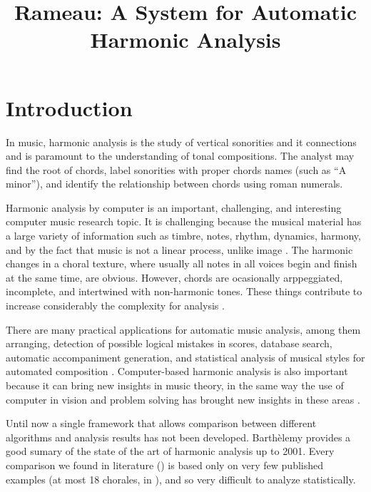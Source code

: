 \documentclass{article}
\title{Rameau: A System for Automatic Harmonic Analysis}
\begin{document}
\graphicspath{{figs/}{data/}}
\maketitle

\begin{abstract}

\end{abstract}

\section{Introduction}
\label{sec:introduction}

In music, harmonic analysis is the study of vertical sonorities and it
connections and is paramount to the understanding of tonal
compositions. The analyst may find the root of chords, label
sonorities with proper chords names (such as ``A minor''), and
identify the relationship between chords using roman
numerals.

Harmonic analysis by computer is an important, challenging, and
interesting computer music research topic. It is challenging because
the musical material has a large variety of information such as
timbre, notes, rhythm, dynamics, harmony, and by the fact that music
is not a linear process, unlike image \cite{mouton.ea:numeric}. The
harmonic changes in a choral texture, where usually all notes in all
voices begin and finish at the same time, are obvious. However, chords
are ocasionally arppeggiated, incomplete, and intertwined with
non-harmonic tones. These things contribute to increase considerably
the complexity for analysis \cite{pardo.ea:automated}.

There are many practical applications for automatic music analysis,
among them arranging, detection of possible logical mistakes in
scores, database search, automatic accompaniment generation, and
statistical analysis of musical styles for automated composition
\cite{pardo.ea:algorithms,temperley.ea:modeling}. Computer-based
harmonic analysis is also important because it can bring new insights
in music theory, in the same way the use of computer in vision and
problem solving has brought new insights in these areas
\cite{temperley.ea:modeling}. 

Until now a single framework that allows comparison between different
algorithms and analysis results has not been developed.  Barthèlemy
\cite{barthelemy.ea:figured} provides a good sumary of the state of
the art of harmonic analysis up to 2001. Every comparison we found in
literature (\cite{pardo.ea:automated, barthelemy.ea:figured,
  tsui:harmonic, taube:automatic, illescas.ea:harmonic}) is based only
on very few published examples (at most 18 chorales, in
\cite{tsui:harmonic}), and so very difficult to analyze statistically.
\end{document}
